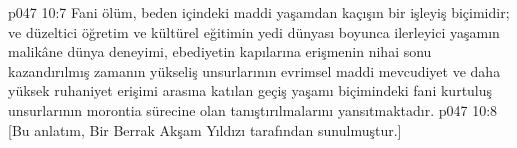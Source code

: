 \vs p047 10:7 Fani ölüm, beden içindeki maddi yaşamdan kaçışın bir işleyiş biçimidir; ve düzeltici öğretim ve kültürel eğitimin yedi dünyası boyunca ilerleyici yaşamın malikâne dünya deneyimi, ebediyetin kapılarına erişmenin nihai sonu kazandırılmış zamanın yükseliş unsurlarının evrimsel maddi mevcudiyet ve daha yüksek ruhaniyet erişimi arasına katılan geçiş yaşamı biçimindeki fani kurtuluş unsurlarının morontia sürecine olan tanıştırılmalarını yansıtmaktadır.
\vs p047 10:8 [Bu anlatım, Bir Berrak Akşam Yıldızı tarafından sunulmuştur.]
